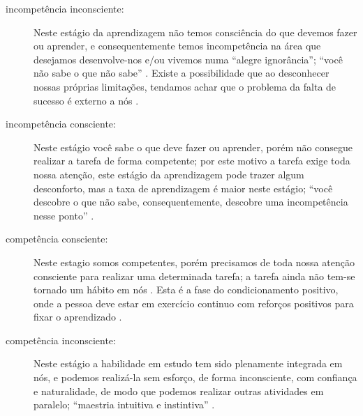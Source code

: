 \begin{description}
\item[incompetência inconsciente:] Neste estágio da aprendizagem não temos consciência do que devemos fazer ou aprender,
\label{ref:IncompetenciaInconsciente}
e consequentemente temos incompetência na área que desejamos desenvolve-nos e/ou vivemos numa ``alegre ignorância'';
``você não sabe o que não sabe'' \cite[pp. 29, 252]{seymourtreinando} \cite{carnegie2014lideranca} \cite{de2013treinamentos}.
Existe a possibilidade que ao desconhecer nossas próprias limitações,
tendamos achar que o problema da falta de sucesso é externo a nós \cite[pp. 10]{passadori7}.
\item[incompetência consciente:] Neste estágio você sabe o que deve fazer ou aprender,
\label{ref:IncompetenciaConsciente}
porém não consegue realizar a tarefa de forma competente;
por este motivo a tarefa exige toda nossa atenção, 
este estágio da aprendizagem pode trazer algum desconforto,
mas a taxa de aprendizagem é maior neste estágio;
``você descobre o que não sabe, consequentemente, descobre uma incompetência nesse ponto''
\cite[pp. 29]{seymourtreinando} \cite{carnegie2014lideranca} \cite[pp. 10, 11]{passadori7} \cite{de2013treinamentos}.
\item[competência consciente:] 
\label{ref:CompetenciaConsciente}
Neste estagio somos competentes, 
porém precisamos de toda nossa atenção consciente 
para realizar uma determinada tarefa; a tarefa ainda não tem-se tornado um hábito em nós 
\cite[pp. 30, 249]{seymourtreinando} \cite{carnegie2014lideranca} \cite{de2013treinamentos}.
Esta é a fase do condicionamento positivo,
onde a pessoa deve estar em exercício continuo com reforços positivos para fixar o aprendizado \cite[pp. 11]{passadori7}.
\item[competência inconsciente:] 
\label{ref:CompetenciaInconsciente}
Neste estágio a habilidade em estudo tem sido plenamente integrada em nós, 
e podemos realizá-la sem esforço, de forma inconsciente, com confiança e naturalidade, 
de modo que podemos realizar outras atividades em paralelo;
``maestria intuitiva e instintiva'' \cite[pp. 30, 249]{seymourtreinando} \cite[pp. 11]{passadori7} \cite{de2013treinamentos}.
\end{description}



